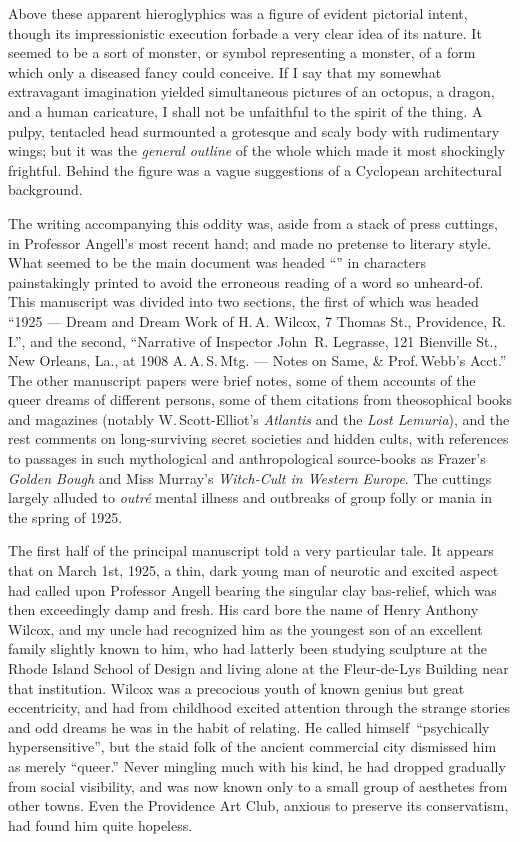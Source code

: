 Above these apparent hieroglyphics was a figure of evident pictorial
intent, though its impressionistic execution forbade a very clear idea
of its nature. It seemed to be a sort of monster, or symbol representing
a monster, of a form which only a diseased fancy could conceive. If I
say that my somewhat extravagant imagination yielded simultaneous
pictures of an octopus, a dragon, and a human caricature, I shall not be
unfaithful to the spirit of the thing. A pulpy, tentacled head
surmounted a grotesque and scaly body with rudimentary wings; but it was
the \emph{general outline} of the whole which made it most shockingly
frightful. Behind the figure was a vague suggestions of a Cyclopean
architectural background.

The writing accompanying this oddity was, aside from a stack of press
cuttings, in Professor Angell's most recent hand; and made no pretense
to literary style. What seemed to be the main document was headed
``'' in characters painstakingly printed to avoid the
erroneous reading of a word so unheard-of. This manuscript was divided
into two sections, the first of which was headed ``1925 --- Dream
and Dream Work of H.\,A. Wilcox, 7 Thomas St., Providence, R.\,I.'', and the
second, ``Narrative of Inspector John\est\ R. Legrasse, 121 Bienville St.,
New Orleans, La., at 1908 A.\,A.\,S.\,Mtg. --- Notes on Same, \& Prof.\,Webb's
Acct.'' The other manuscript papers were brief notes, some of them
accounts of the queer dreams of different persons, some of them
citations from theosophical books and magazines (notably W.\,Scott-Elliot's \emph{Atlantis} and the \emph{Lost Lemuria}), and the rest comments on
long-surviving secret societies and hidden cults, with references to
passages in such mythological and anthropological source-books as
Frazer's \emph{Golden Bough} and Miss Murray's \emph{Witch-Cult in Western Europe}.
The cuttings largely alluded to \emph{outré} mental illness and outbreaks of
group folly or mania in the spring of 1925.

The first half of the principal manuscript told a very particular tale.
It appears that on March 1st, 1925, a thin, dark young man of neurotic
and excited aspect had called upon Professor Angell bearing the singular
clay bas-relief, which was then exceedingly damp and fresh. His card
bore the name of Henry Anthony Wilcox, and my uncle had recognized him
as the youngest son of an excellent family slightly known to him, who
had latterly been studying sculpture at the Rhode Island School of
Design and living alone at the Fleur-de-Lys Building near that
institution. Wilcox was a precocious youth of known genius but great
eccentricity, and had from childhood excited attention through the
strange stories and odd dreams he was in the habit of relating. He
called himself\est\ ``psychically hypersensitive'', but the staid folk of the
ancient commercial city dismissed him as merely ``queer.'' Never
mingling much with his kind, he had dropped gradually from social
visibility, and was now known only to a small group of aesthetes from
other towns. Even the Providence Art Club, anxious to preserve its
conservatism, had found him quite hopeless.

